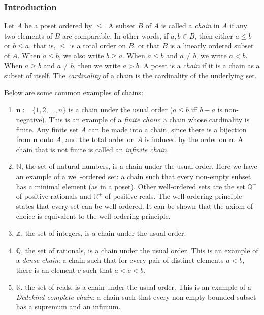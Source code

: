 \documentclass{article}
\begin{document}
\subsubsection*{Introduction}

Let $A$ be a poset ordered by $\le$.  A subset $B$ of $A$ is called a \emph{chain} in $A$ if any two elements of $B$ are comparable.  In other words, if $a,b\in B$, then either $a\le b$ or $b\le a$, that is, $\le$ is a total order on $B$, or that $B$ is a linearly ordered subset of $A$.  When $a\le b$, we also write $b\ge a$.  When $a\le b$ and $a\ne b$, we write $a<b$.  When $a\ge b$ and $a\ne b$, then we write $a>b$.  A poset is a \emph{chain} if it is a chain as a subset of itself.  The \emph{cardinality} of a chain is the cardinality of the underlying set.

Below are some common examples of chains:
\begin{enumerate}
\item $\mathbf{n}:=\lbrace 1, 2, \ldots, n\rbrace$ is a chain under the usual order ($a\le b$ iff $b-a$ is non-negative).  This is an example of a \emph{finite chain}: a chain whose cardinality is finite.  Any finite set $A$ can be made into a chain, since there is a bijection from $\mathbf{n}$ onto $A$, and the total order on $A$ is induced by the order on $\mathbf{n}$.  A chain that is not finite is called an \emph{infinite chain}.
\item $\mathbb{N}$, the set of natural numbers, is a chain under the usual order.  Here we have an example of a well-ordered set: a chain such that every non-empty subset has a minimal element (as in a poset).  Other well-ordered sets are the set $\mathbb{Q}^{+}$ of positive rationals and $\mathbb{R}^{+}$ of positive reals.  The well-ordering principle states that every set can be well-ordered.  It can be shown that the axiom of choice is equivalent to the well-ordering principle.
\item $\mathbb{Z}$, the set of integers, is a chain under the usual order.
\item $\mathbb{Q}$, the set of rationals, is a chain under the usual order.  This is an example of a \emph{dense chain}: a chain such that for every pair of distinct elements $a<b$, there is an element $c$ such that $a<c<b$.
\item $\mathbb{R}$, the set of reals, is a chain under the usual order.  This is an example of a \emph{Dedekind complete chain}: a chain such that every non-empty bounded subset has a supremum and an infimum.
\end{enumerate}
\end{document}
